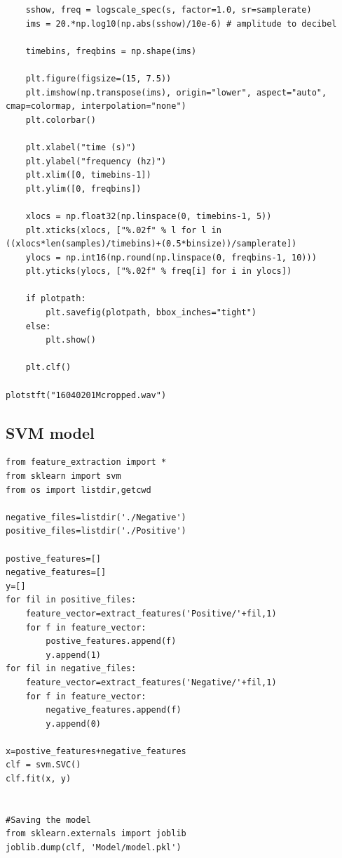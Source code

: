 \documentclass[12pt]{article}
\numberwithin{figure}{section}
\numberwithin{table}{section}
\begin{document}
\begin{lstlisting}
    sshow, freq = logscale_spec(s, factor=1.0, sr=samplerate)
    ims = 20.*np.log10(np.abs(sshow)/10e-6) # amplitude to decibel
    
    timebins, freqbins = np.shape(ims)
    
    plt.figure(figsize=(15, 7.5))
    plt.imshow(np.transpose(ims), origin="lower", aspect="auto", cmap=colormap, interpolation="none")
    plt.colorbar()

    plt.xlabel("time (s)")
    plt.ylabel("frequency (hz)")
    plt.xlim([0, timebins-1])
    plt.ylim([0, freqbins])

    xlocs = np.float32(np.linspace(0, timebins-1, 5))
    plt.xticks(xlocs, ["%.02f" % l for l in ((xlocs*len(samples)/timebins)+(0.5*binsize))/samplerate])
    ylocs = np.int16(np.round(np.linspace(0, freqbins-1, 10)))
    plt.yticks(ylocs, ["%.02f" % freq[i] for i in ylocs])
    
    if plotpath:
        plt.savefig(plotpath, bbox_inches="tight")
    else:
        plt.show()
        
    plt.clf()

plotstft("16040201Mcropped.wav")

\end{lstlisting}


\newpage
\subsection{SVM model}
\begin{lstlisting}
from feature_extraction import *
from sklearn import svm
from os import listdir,getcwd

negative_files=listdir('./Negative')
positive_files=listdir('./Positive')

postive_features=[]
negative_features=[]
y=[]
for fil in positive_files:
    feature_vector=extract_features('Positive/'+fil,1)
    for f in feature_vector:
        postive_features.append(f)
        y.append(1)
for fil in negative_files:
    feature_vector=extract_features('Negative/'+fil,1)
    for f in feature_vector:
        negative_features.append(f)
        y.append(0)

x=postive_features+negative_features
clf = svm.SVC()
clf.fit(x, y)


#Saving the model
from sklearn.externals import joblib
joblib.dump(clf, 'Model/model.pkl')
\end{lstlisting}

\newpage
\end{document}
